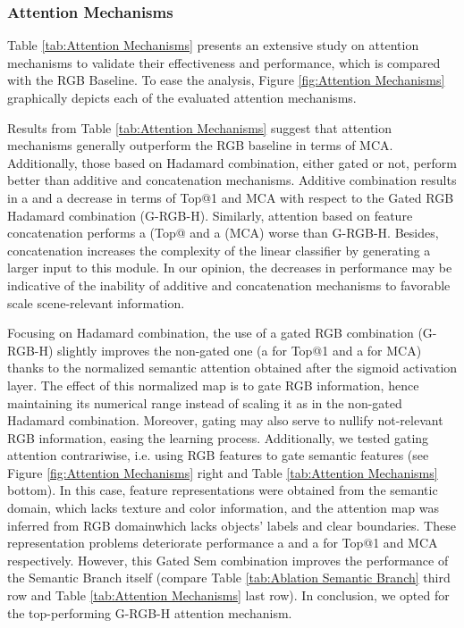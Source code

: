\documentclass[review, 3p, sort&compress]{elsarticle}
\begin{document}
\subsubsection*{Attention Mechanisms}
Table \ref{tab:Attention Mechanisms} presents an extensive study on attention mechanisms to validate their effectiveness and performance, which is compared with the RGB Baseline. To ease the analysis, Figure \ref{fig:Attention Mechanisms} graphically depicts each of the evaluated attention mechanisms.

Results from Table \ref{tab:Attention Mechanisms} suggest that attention mechanisms generally outperform the RGB baseline in terms of MCA. Additionally, those based on Hadamard combination, either gated or not, perform better than additive and concatenation mechanisms. Additive combination results in a  and a  decrease in terms of Top@1 and MCA with respect to the Gated RGB Hadamard combination (G-RGB-H). Similarly, attention based on feature concatenation performs a  (Top@ and a  (MCA) worse than G-RGB-H. Besides, concatenation increases the complexity of the linear classifier by generating a larger input to this module. In our opinion, the decreases in performance may be indicative of the inability of additive and concatenation mechanisms to favorable scale scene-relevant information.

Focusing on Hadamard combination, the use of a gated RGB combination (G-RGB-H) slightly improves the non-gated one (a  for Top@1 and a  for MCA) thanks to the normalized semantic attention obtained after the sigmoid activation layer. The effect of this normalized map is to gate RGB information, hence maintaining its numerical range instead of scaling it as in the non-gated Hadamard combination. Moreover, gating may also serve to nullify not-relevant RGB information, easing the learning process. Additionally, we tested gating attention contrariwise, i.e. using RGB features to gate semantic features (see Figure \ref{fig:Attention Mechanisms} right and Table \ref{tab:Attention Mechanisms} bottom). In this case, feature representations were obtained from the semantic domain, which lacks texture and color information, and the attention map was inferred from RGB domain\textemdash which lacks objects' labels and clear boundaries. These representation problems deteriorate performance a  and a  for Top@1 and MCA respectively. However, this Gated Sem combination improves the performance of the Semantic Branch itself (compare Table \ref{tab:Ablation Semantic Branch} third row and Table \ref{tab:Attention Mechanisms} last row). In conclusion, we opted for the top-performing G-RGB-H attention mechanism. 
\end{document}
